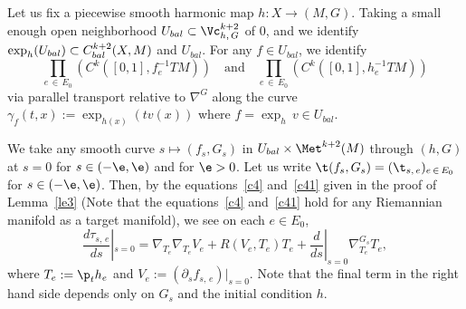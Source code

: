 Let us fix a piecewise smooth harmonic map $h: X\to (M,G)$. Taking a small enough open neighborhood $U_{bal}\subset \Vc_{h,\,G}^{k+2}$ of $0$, and we identify ${\exp}_h(U_{bal})\subset C^{k+2}_{bal}\linebreak(X, M)$ and $U_{bal}$. For any $f \in U_{bal}$, we identify
\[
\prod_{e\,\in\,E_0}\left(C^k\left([0, 1], f_e^{-1}TM\right)\right) \quad \text{and} \quad \prod_{e\,\in\, E_0}\left(C^k\left([0, 1], h_e^{-1}TM\right)\right)
\]
via parallel transport relative to $\nabla^G$ along the curve $\gamma_f(t,x):=\exp_{h(x)}(tv(x))$ where $f=\exp_h\, v\in U_{bal}$.



We take any smooth curve $s \mapsto (f_s, G_s)$ in $U_{bal}\times \Met^{k+2}(M)$ through $(h, G)$ at $s=0$ for $s \in (-\e, \e)$ and for $\e>0$. Let us write $\t(f_s, G_s)=(\t_{s,\,e})_{e\,\in\,E_0}$ for $s \in (-\e, \e)$. Then, by the equations~\eqref{c4} and~\eqref{c41} given in the proof of Lemma~\ref{le3} (Note that the equations~\eqref{c4} and~\eqref{c41} hold for any Riemannian manifold as a target manifold), we see on each $e \in E_0$,
\begin{equation}\label{derivtau}
\frac{d\tau_{s,\,e}}{ds}\left|_{s=0}=\nabla_{T_e}\nabla_{T_e}V_e+R\left(V_e, T_e\right)T_e+\frac{d}{ds}\right|_{s=0} \nabla^{G_s}_{T_e}T_e,
\end{equation}
where $T_e:=\p_t h_e$ and $V_e:=(\partial_s f_{s, \,e})|_{s=0}$. Note that the final term in the right hand side depends only on $G_s$ and the initial condition $h$.

